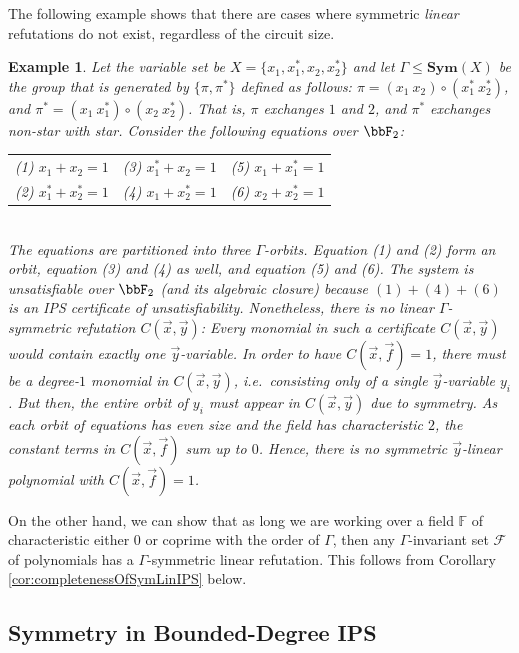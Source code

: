 \documentclass[10pt,a4paper]{article}
\newtheorem{example}[theorem]{Example}
\newcommand{\Sym}{{\mathbf{Sym}}}
\newcommand{\Field}{\ensuremath{\mathbb{F}}}
\newcommand{\F}{\ensuremath{\mathcal{F}}}
\begin{document}
The following example shows that there are cases where symmetric \emph{linear} refutations do not exist, regardless of the circuit size.
\begin{example}
	\label{ex:incompletenessOfSymHilbert}
	Let the variable set be $X = \{x_1, x_1^*, x_2, x_2^*\}$ and let $\Gamma \leq \Sym(X)$ be the group that is generated by $\{\pi,\pi^*\}$ defined as follows: $\pi = (x_1 \ x_2) \circ (x_1^* \ x_2^*)$, and $\pi^* = (x_1 \ x_1^*) \circ (x_2 \ x_2^*)$. That is, $\pi$ exchanges $1$ and $2$, and $\pi^*$ exchanges non-star with star. Consider the following equations over $\bbF_2$:\\
	\begin{tabular}{ccc}
		 (1) $x_1 + x_2 = 1$       &   (3) $x_1^*+x_2 = 1$       &  (5) $x_1 + x_1^* = 1$       \\
		  (2) $x_1^* + x_2^* = 1$ & (4) $x_1+x_2^* = 1$ & (6) $x_2 + x_2^* = 1$\\
	\end{tabular}	 
	~\\
	The equations are partitioned into three $\Gamma$-orbits. Equation (1) and (2) form an orbit, equation (3) and (4) as well, and equation (5) and (6).
	The system is unsatisfiable over $\bbF_2$ (and its algebraic closure) because $(1)+(4)+(6)$ is an IPS certificate of unsatisfiability.
	Nonetheless, there is no linear $\Gamma$-symmetric refutation $C(\vec x, \vec y)$: 
	Every monomial in such a certificate $C(\vec x, \vec y)$ would contain exactly one $\vec y$-variable. 
	In order to have $C(\vec x, \vec f) = 1$, there must be a degree-$1$ monomial in $C(\vec x, \vec y)$, i.e.\ consisting only of a single $\vec y$-variable $y_i$. But then, the entire orbit of $y_i$ must appear in $C(\vec x, \vec y)$ due to symmetry. As each orbit of equations has even size and the field has characteristic $2$, the constant terms in $C(\vec x, \vec f)$ sum up to $0$. Hence, there is no symmetric $\vec y$-linear polynomial with $C(\vec x, \vec f) = 1$.
\end{example}	 

On the other hand, we can show that as long we are working over a field $\Field$ of characteristic either $0$ or coprime with the order of $\Gamma$, then any $\Gamma$-invariant set $\F$ of polynomials has a $\Gamma$-symmetric linear refutation.  This follows from Corollary \ref{cor:completenessOfSymLinIPS} below.




\subsection{Symmetry in Bounded-Degree IPS}
\end{document}
